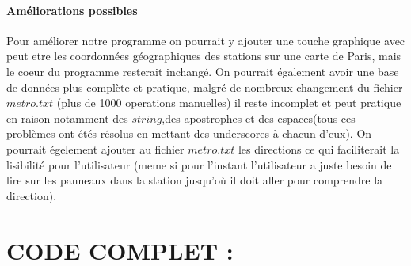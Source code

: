 \documentclass[a4paper]{article}
\begin{document}
  \paragraph{Améliorations possibles}
  Pour améliorer notre programme on pourrait y ajouter une touche graphique avec peut etre les coordonnées géographiques des stations sur une carte de Paris, mais le coeur du programme resterait inchangé.
  On pourrait également avoir une base de données plus complète et pratique, malgré de nombreux changement du fichier $metro.txt$ (plus de 1000 operations manuelles) il reste incomplet et peut pratique en raison notamment des $string$,des apostrophes et des espaces(tous ces problèmes ont étés résolus en mettant des underscores à chacun d'eux).
  On pourrait égelement ajouter au fichier $metro.txt$ les directions ce qui faciliterait la lisibilité pour l'utilisateur (meme si pour l'instant l'utilisateur a juste besoin de lire sur les panneaux dans la station jusqu'où il doit aller pour comprendre la direction).
\newpage
{}


\section{CODE COMPLET :}
  
  \newpage
  
  \newpage
  
  \newpage
  
  \newpage
  
  \newpage
  
  \newpage
  
  \newpage
  
  \newpage
  
\end{document}

